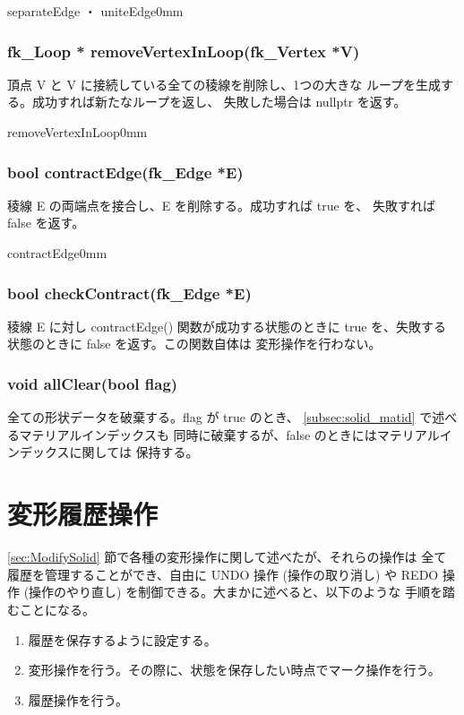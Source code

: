 	{separateEdge ・ uniteEdge}{0mm}

 \subsubsection*{\hspace*{0.6cm}fk\_Loop * removeVertexInLoop(fk\_Vertex *V)}
	頂点 V と V に接続している全ての稜線を削除し、1つの大きな
	ループを生成する。成功すれば新たなループを返し、
	失敗した場合は nullptr を返す。

	{removeVertexInLoop}{0mm}

 \subsubsection*{\hspace*{0.6cm}bool contractEdge(fk\_Edge *E)}
	稜線 E の両端点を接合し、E を削除する。成功すれば true を、
	失敗すれば false を返す。

	{contractEdge}{0mm}

 \subsubsection{\hspace*{0.6cm}bool checkContract(fk\_Edge *E)}
	稜線 E に対し contractEdge() 関数が成功する状態のときに
	true を、失敗する状態のときに false を返す。この関数自体は
	変形操作を行わない。

 \subsubsection{\hspace*{0.6cm}void allClear(bool flag)}
	全ての形状データを破棄する。flag が true のとき、
	\ref{subsec:solid_matid} で述べるマテリアルインデックスも
	同時に破棄するが、false のときにはマテリアルインデックスに関しては
	保持する。

\section{変形履歴操作}
\ref{sec:ModifySolid} 節で各種の変形操作に関して述べたが、それらの操作は
全て履歴を管理することができ、自由に UNDO 操作 (操作の取り消し) や
REDO 操作 (操作のやり直し) を制御できる。大まかに述べると、以下のような
手順を踏むことになる。
\begin{enumerate}
 \item 履歴を保存するように設定する。
 \item 変形操作を行う。その際に、状態を保存したい時点でマーク操作を行う。
 \item 履歴操作を行う。
\end{enumerate}

